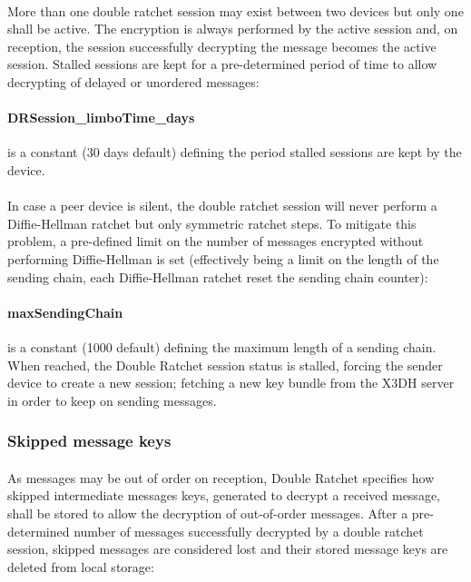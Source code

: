 \documentclass[a4paper,11pt]{article}
\begin{document}
      \paragraph{}More than one double ratchet session may exist between two devices but only one shall be active. The encryption is always performed by the active session and, on reception, the session successfully decrypting the message becomes the active session. Stalled sessions are kept for a pre-determined period of time to allow decrypting of delayed or unordered messages:
      \paragraph{DRSession\_limboTime\_days}is a constant (30 days default) defining the period stalled sessions are kept by the device.
      \paragraph{}In case a peer device is silent, the double ratchet session will never perform a Diffie-Hellman ratchet but only symmetric ratchet steps. To mitigate this problem, a pre-defined limit on the number of messages encrypted without performing Diffie-Hellman is set (effectively being a limit on the length of the sending chain, each Diffie-Hellman ratchet reset the sending chain counter):
      \paragraph{maxSendingChain}is a constant (1000 default) defining the maximum length of a sending chain. When reached, the Double Ratchet session status is stalled, forcing the sender device to create a new session; fetching a new key bundle from the X3DH server in order to keep on sending messages.
    
    \subsubsection{Skipped message keys}
      \paragraph{}As messages may be out of order on reception, Double Ratchet specifies how skipped intermediate messages keys, generated to decrypt a received message, shall be stored to allow the decryption of out-of-order messages. After a pre-determined number of messages successfully decrypted by a double ratchet session, skipped messages are considered lost and their stored message keys are deleted from local storage:
\end{document}
